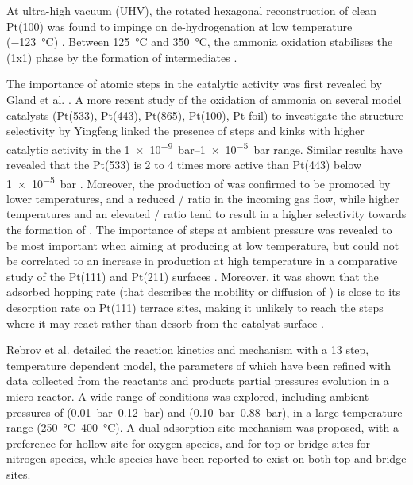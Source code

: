 At ultra-high vacuum (UHV), the rotated hexagonal reconstruction of clean Pt(100) \parencite{Hammer2016} was found to impinge on  de-hydrogenation at low temperature (\qty{-123}{\degreeCelsius}) \parencite{Bradley1997}.
Between \qty{125}{\degreeCelsius} and \qty{350}{\degreeCelsius}, the ammonia oxidation stabilises the (1x1) phase by the formation of  intermediates \parencite{Rafti2007}.

The importance of atomic steps in the catalytic activity was first revealed by Gland et al. \parencite*{Gland1978, Gland1980}.
A more recent study of the oxidation of ammonia on several model catalysts (Pt(533), Pt(443), Pt(865), Pt(100), Pt foil) to investigate the structure selectivity by Yingfeng \parencite*{Yingfeng2008} linked the presence of steps and kinks with higher catalytic activity in the \qtyrange{1e-9}{1e-5}{\bar} range.
Similar results have revealed that the Pt(533) is 2 to 4 times more active than Pt(443) below \qty{1e-5}{\bar} \parencite{Scheibe2005}.
Moreover, the production of  was confirmed to be promoted by lower temperatures, and a reduced / ratio in the incoming gas flow, while higher temperatures and an elevated / ratio tend to result in a higher selectivity towards the formation of  \parencite{Zeng2009}.
The importance of steps at ambient pressure was revealed to be most important when aiming at producing  at low temperature, but could not be correlated to an increase in  production at high temperature in a comparative study of the Pt(111) and Pt(211) surfaces \parencite{Ma2019}.
Moreover, it was shown that the adsorbed  hopping rate (that describes the mobility or diffusion of ) is close to its desorption rate on Pt(111) terrace sites, making it unlikely to reach the steps where it may react rather than desorb from the catalyst surface \parencite{Borodin2021}.

Rebrov et al. \parencite*{Rebrov2002} detailed the reaction kinetics and mechanism with a 13 step, temperature dependent model, the parameters of which have been refined with data collected from the reactants and products partial pressures evolution in a micro-reactor.
A wide range of conditions was explored, including ambient pressures of  (\qtyrange{0.01}{0.12}{\bar}) and  (\qtyrange{0.10}{0.88}{\bar}), in a large temperature range (\qtyrange{250}{400}{\degreeCelsius}).
A dual adsorption site mechanism was proposed, with a preference for hollow site for oxygen species, and for top or bridge sites for nitrogen species, while  species have been reported to exist on both top and bridge sites.

